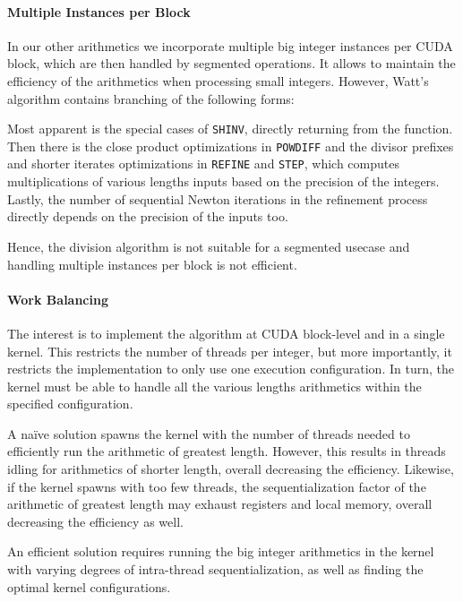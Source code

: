 \paragraph{Multiple Instances per Block}
In our other arithmetics we incorporate multiple big integer instances per CUDA
block, which are then handled by segmented operations. It allows to maintain the
efficiency of the arithmetics when processing small integers. However, Watt's
algorithm contains branching of the following forms:

Most apparent is the special cases of \texttt{SHINV}, directly returning from
the function. Then there is the close product optimizations in \texttt{POWDIFF}
and the divisor prefixes and shorter iterates optimizations in \texttt{REFINE}
and \texttt{STEP}, which computes multiplications of various lengths inputs
based on the precision of the integers. Lastly, the number of sequential Newton
iterations in the refinement process directly depends on the precision of the
inputs too.

Hence, the division algorithm is not suitable for a segmented usecase and
handling multiple instances per block is not efficient.

\paragraph{Work Balancing}
The interest is to implement the algorithm at CUDA block-level and in a single
kernel. This restricts the number of threads per integer, but more importantly,
it restricts the implementation to only use one execution configuration. In
turn, the kernel must be able to handle all the various lengths arithmetics
within the specified configuration.

A naïve solution spawns the kernel with the number of threads needed to
efficiently run the arithmetic of greatest length. However, this results in
threads idling for arithmetics of shorter length, overall decreasing the
efficiency. Likewise, if the kernel spawns with too few threads, the
sequentialization factor of the arithmetic of greatest length may exhaust
registers and local memory, overall decreasing the efficiency as well.

An efficient solution requires running the big integer arithmetics in the kernel
with varying degrees of intra-thread sequentialization, as well as finding the
optimal kernel configurations.

